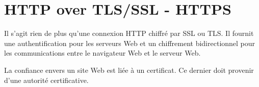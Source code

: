 \section{HTTP over TLS/SSL - HTTPS}
Il s'agit rien de plus qu'une connexion HTTP chiffré par SSL ou TLS.
Il fournit une authentification pour les serveurs Web et un chiffrement bidirectionnel pour les communications entre le navigateur Web et le serveur Web.

La confiance envers un site Web est liée à un certificat. 
Ce dernier doit provenir d'une autorité certificative. 